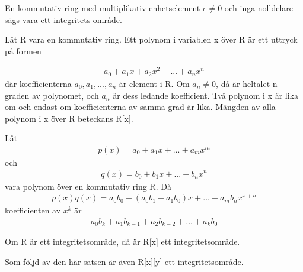 \begin{definition}
 En kommutativ ring med multiplikativ enhetselement $e \neq 0$ och inga nolldelare sägs vara ett integritets område.
\end{definition}

\begin{definition}
Låt R vara en kommutativ ring. Ett polynom i variablen x över R är ett uttryck på formen 

\begin{align*}
 a_0+a_1x+a_2x^2+...+a_nx^n
\end{align*}
där koefficienterna $a_0, a_1,...,a_n$ är element i R. Om $a_n \neq 0$, då är heltalet n graden av polynomet, och $a_n$ är dess ledande koefficient. Två polynom i x är lika om och endast om 
koefficienterna av samma grad är lika. Mängden av alla polynom i x över R beteckans R[x]. 

\end{definition}

\begin{definition}
 Låt
\begin{align*}
 p(x)=a_0+a_1x+...+a_mx^m
\end{align*}
och
\begin{align*}
 q(x)=b_0+b_1x+...+b_nx^n
\end{align*}
vara polynom över en kommutativ ring R. Då
\begin{align*}
 p(x)q(x)=a_0b_0+(a_0b_1+a_1b_0)x+...+a_mb_nx^{x+n}
\end{align*}
koefficienten av $x^k$ är
\begin{align*}
 a_0b_k+a_1b_{k-1}+a_2b_{k-2}+...+a_kb_0
\end{align*}

\end{definition}

\begin{theorem}
 Om R är ett integritetsområde, då är R[x] ett integritetsområde.
\end{theorem}

Som följd av den här satsen är även R[x][y] ett integritetsområde.
